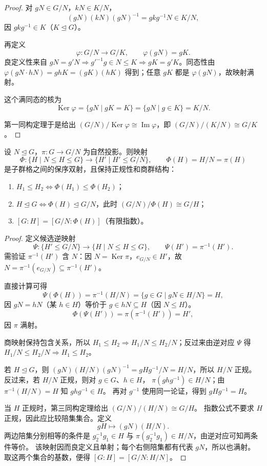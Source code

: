 \begin{proof}
对 $gN\in G/N$，$kN\in K/N$，
\[
(gN)(kN)(gN)^{-1}=gkg^{-1}N\in K/N,
\]
因 $gkg^{-1}\in K$（$K\mathrel{\trianglelefteq} G$）。

再定义
\[
\varphi:G/N\to G/K,\qquad\varphi(gN)=gK.
\]
良定义性来自 $gN=g'N\Rightarrow g'^{-1}g\in N\le K\Rightarrow gK=g'K$。同态性由 $\varphi(gN\cdot hN)=ghK=(gK)(hK)$ 得到；任意 $gK$ 都是 $\varphi(gN)$，故映射满射。

这个满同态的核为
\[
\operatorname{Ker}\varphi=\{gN\mid gK=K\}=\{gN\mid g\in K\}=K/N.
\]

第一同构定理于是给出 $(G/N)/\operatorname{Ker}\varphi\cong\operatorname{Im}\varphi$，即 $(G/N)/(K/N)\cong G/K$。
\end{proof}

\begin{theorem}
\label{thm:correspondence}
设 $N\mathrel{\trianglelefteq} G$，$\pi:G\to G/N$ 为自然投影。则映射
\[
\Phi:\{H\mid N\le H\le G\}\longrightarrow\{H'\mid H'\le G/N\},
\qquad
\Phi(H)=H/N=\pi(H)
\]
是子群格之间的保序双射，且保持正规性和商群结构：
\begin{enumerate}[label=(\roman*),leftmargin=3em]
\item $H_1\le H_2\iff\Phi(H_1)\le\Phi(H_2)$；
\item $H\mathrel{\trianglelefteq} G\iff\Phi(H)\mathrel{\trianglelefteq} G/N$，此时 $(G/N)/\Phi(H)\cong G/H$；
\item $[G:H]=[G/N:\Phi(H)]$（有限指数）。
\end{enumerate}

\end{theorem}

\begin{proof}
定义候选逆映射
\[
\Psi:\{H'\le G/N\}\to\{H\mid N\le H\le G\},
\qquad
\Psi(H')=\pi^{-1}(H').
\]
需验证 $\pi^{-1}(H')$ 含 $N$：因 $N=\operatorname{Ker}\pi$，$e_{G/N}\in H'$，故 $N=\pi^{-1}(e_{G/N})\subseteq\pi^{-1}(H')$。

直接计算可得
\[
\Psi(\Phi(H))=\pi^{-1}(H/N)=\{g\in G\mid gN\in H/N\}=H,
\]
因 $gN=hN$（某 $h\in H$）等价于 $g\in hN\subseteq H$（因 $N\le H$）。
\[
\Phi(\Psi(H'))=\pi(\pi^{-1}(H'))=H',
\]
因 $\pi$ 满射。

商映射保持包含关系，所以 $H_1\le H_2\Rightarrow H_1/N\le H_2/N$；反过来由逆对应 $\Psi$ 得 $H_1/N\le H_2/N\Rightarrow H_1\le H_2$。

若 $H\mathrel{\trianglelefteq}G$，则
$(gN)(H/N)(gN)^{-1}=gHg^{-1}/N=H/N$，所以 $H/N$ 正规。
反过来，若 $H/N$ 正规，则对 $g\in G$、$h\in H$，
$\pi(ghg^{-1})\in H/N$；由 $\pi^{-1}(H/N)=H$ 知 $ghg^{-1}\in H$。
再对 $g^{-1}$ 使用同一论证，得到 $gHg^{-1}=H$。

当 $H$ 正规时，第三同构定理给出 $(G/N)/(H/N)\cong G/H$。
指数公式不要求 $H$ 正规，因此应比较陪集集合。定义
\[
gH\longmapsto (gN)(H/N).
\]
两边陪集分别相等的条件是 $g_2^{-1}g_1\in H$ 与
$\pi(g_2^{-1}g_1)\in H/N$，由逆对应可知两条件等价。
该映射因而良定义且单射；每个右侧陪集都有代表 $gN$，所以也满射。
取这两个集合的基数，便得 $[G:H]=[G/N:H/N]$。
\end{proof}

